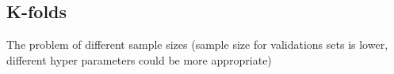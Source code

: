 
\subsection{K-folds}

The problem of different sample sizes (sample size for validations sets is lower, different hyper parameters could be more appropriate)
